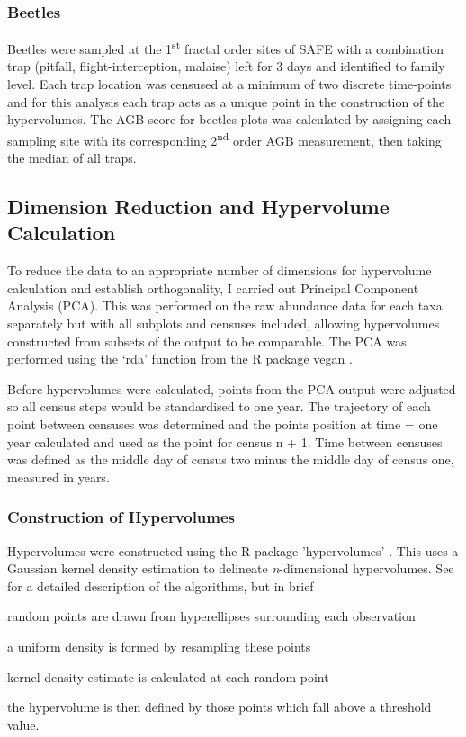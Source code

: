 	
	\subsubsection*{Beetles}
	
	Beetles were sampled at the 1\textsuperscript{st} fractal order sites of SAFE with a combination trap (pitfall, flight-interception, malaise) left for 3 days and identified to family level. Each trap location was censused at a minimum of two discrete time-points and for this analysis each trap acts as a unique point in the construction of the hypervolumes. The AGB score for beetles plots was calculated by assigning each sampling site with its corresponding 2\textsuperscript{nd} order AGB measurement, then taking the median of all traps.
		
\subsection{Dimension Reduction and Hypervolume Calculation}
	
	
    To reduce the data to an appropriate number of dimensions for hypervolume calculation and establish orthogonality, I carried out Principal Component Analysis (PCA). This was performed on the raw abundance data for each taxa separately but with all subplots and censuses included, allowing hypervolumes constructed from subsets of the output to be comparable. The PCA was performed using the `rda' function from the R package vegan \citep{Oksanen2018}.	
	
	Before hypervolumes were calculated, points from the PCA output were adjusted so all census steps would be standardised to one year. The trajectory of each point between censuses was determined and the points position at time = one year calculated and used as the point for census n + 1. Time between censuses was defined as the middle day of census two minus the middle day of census one, measured in years.
	
	\subsubsection*{Construction of Hypervolumes}
	Hypervolumes were constructed using the R package 'hypervolumes' \citep{Blonder2017a}. This uses a Gaussian kernel density estimation to delineate \emph{n}-dimensional hypervolumes. See \cite{Blonder2014, Blonder2017b} for a detailed description of the algorithms, but in brief
	\begin{enumerate*}[label=(\roman*)]
		\item random points are drawn from hyperellipses surrounding each observation
		\item a uniform density is formed by resampling these points
		\item kernel density estimate is calculated at each random point
		\item the hypervolume is then defined by those points which fall above a threshold value.
	\end{enumerate*}  
		

